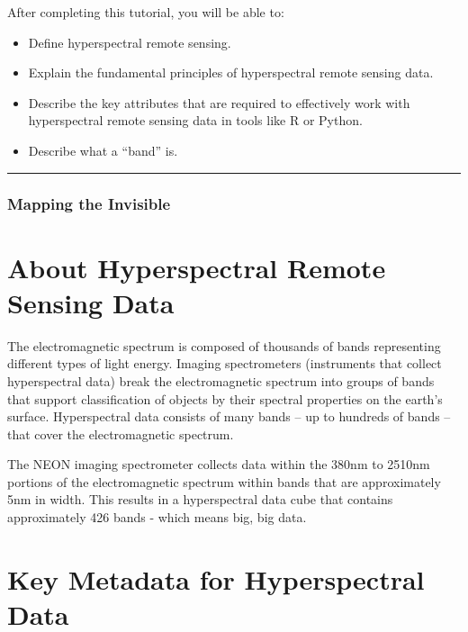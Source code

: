 \documentclass[]{book}
\providecommand{\tightlist}{%
  \setlength{\itemsep}{0pt}\setlength{\parskip}{0pt}}
\begin{document}
After completing this tutorial, you will be able to:

\begin{itemize}
\tightlist
\item
  Define hyperspectral remote sensing.
\item
  Explain the fundamental principles of hyperspectral remote sensing data.
\item
  Describe the key attributes that are required to effectively work with
  hyperspectral remote sensing data in tools like R or Python.
\item
  Describe what a ``band'' is.
\end{itemize}

\begin{center}\rule{0.5\linewidth}{0.5pt}\end{center}

\hypertarget{mapping-the-invisible}{%
\subsubsection{Mapping the Invisible}\label{mapping-the-invisible}}

\hypertarget{about-hyperspectral-remote-sensing-data}{%
\section{About Hyperspectral Remote Sensing Data}\label{about-hyperspectral-remote-sensing-data}}

The electromagnetic spectrum is composed of thousands of bands representing
different types of light energy. Imaging spectrometers (instruments that collect
hyperspectral data) break the electromagnetic spectrum into groups of bands
that support classification of objects by their spectral properties on the
earth's surface. Hyperspectral data consists of many bands -- up to hundreds of
bands -- that cover the electromagnetic spectrum.

The NEON imaging spectrometer collects data within the 380nm to 2510nm portions
of the electromagnetic spectrum within bands that are approximately 5nm in
width. This results in a hyperspectral data cube that contains approximately
426 bands - which means big, big data.

\hypertarget{key-metadata-for-hyperspectral-data}{%
\section{Key Metadata for Hyperspectral Data}\label{key-metadata-for-hyperspectral-data}}
\end{document}
